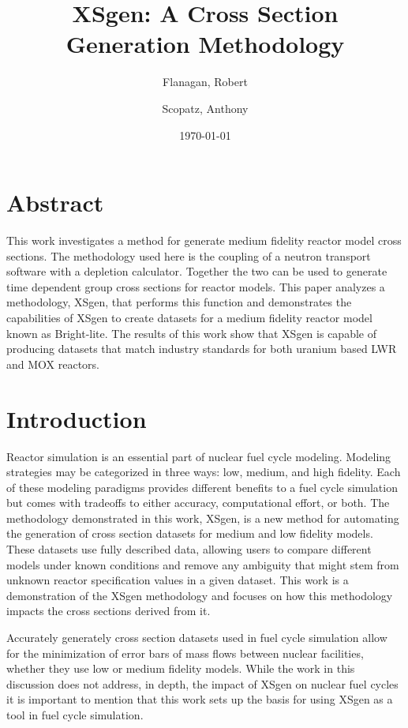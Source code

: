 \documentclass{article}
\begin{document}
\title{XSgen: A Cross Section Generation Methodology}
\date{\today}
\author{Flanagan, Robert \and Scopatz, Anthony}
\maketitle
\onehalfspacing

\section{Abstract}
This work investigates a method for generate medium fidelity reactor model cross sections.
The methodology used here is the coupling of a neutron transport software with a depletion
calculator. Together the two can be used to generate time dependent group cross sections
for reactor models. This paper analyzes a methodology, XSgen, that performs this function
and demonstrates the capabilities of XSgen to create datasets for a medium fidelity reactor
model known as Bright-lite. The results of this work show that XSgen is capable of producing
datasets that match industry standards for both uranium based LWR and MOX reactors. 

\section{Introduction}

Reactor simulation is an essential part of nuclear fuel cycle modeling. Modeling strategies
may be categorized in three ways: low, medium, and high fidelity. Each of these modeling
paradigms provides different benefits to a fuel cycle simulation but comes with tradeoffs to
either accuracy, computational effort, or both. The methodology demonstrated in this work, XSgen, 
is a new method for automating the generation of cross section datasets for medium and low fidelity models. 
These datasets use fully described data, allowing users to compare different models under known
conditions and remove any ambiguity that might stem from unknown reactor specification values in a 
given dataset. This work is a demonstration of the XSgen methodology and focuses on how this methodology
impacts the cross sections derived from it. 

Accurately generately cross section datasets used in fuel cycle simulation allow for the minimization
of error bars of mass flows between nuclear facilities, whether they use low or medium fidelity models.
While the work in this discussion does not address, in depth, the impact of XSgen on nuclear fuel cycles 
it is important to mention that this work sets up the basis for using XSgen as a tool in fuel cycle 
simulation.  
\end{document}

